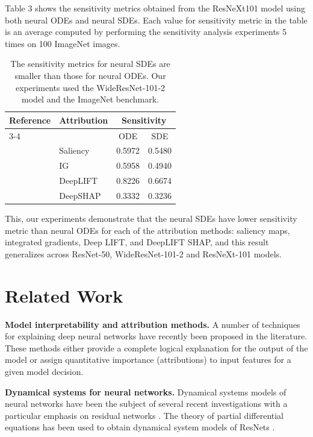 \documentclass[10pt,twocolumn]{article}
\begin{document}
Table 3 shows the sensitivity metrics obtained from the ResNeXt101 model using both neural ODEs and neural SDEs. Each value for sensitivity metric in the table is an average computed by performing the sensitivity analysis experiments 5 times on 100 ImageNet images.

\begin{table}[h!]
\centering
\caption{The sensitivity metrics for neural SDEs are smaller than those for neural ODEs. Our experiments used the WideResNet-101-2 model and the ImageNet benchmark.}
\begin{tabular}{p{4cm}lcc}
\toprule
Reference & Attribution & \multicolumn{2}{c}{Sensitivity} \\
\cmidrule(lr){3-4}
 &  & ODE & SDE \\
\midrule
\cite{simonyan2014deepinsideconvolutionalnetworks} & Saliency & 0.5972 & 0.5480 \\
\cite{pmlr-v70-sundararajan17a} & IG & 0.5958 & 0.4940 \\
\cite{shrikumar2019learningimportantfeaturespropagating} & DeepLIFT & 0.8226 & 0.6674 \\
\cite{lundberg2017unifiedapproachinterpretingmodel} & DeepSHAP & 0.3332 & 0.3236 \\
\bottomrule
\end{tabular}
\label{tab:wideresnet}
\end{table}

This, our experiments demonstrate that the neural SDEs have lower sensitivity metric than neural ODEs for each of the attribution methods: saliency maps, integrated gradients, Deep LIFT, and DeepLIFT SHAP, and this result generalizes across ResNet-50, WideResNet-101-2 and ResNeXt-101 models.

\section{Related Work}

\textbf{Model interpretability and attribution methods.} A number of techniques \cite{adebayo2018sanity} for explaining deep neural networks have recently been proposed in the literature. These methods either provide a complete logical explanation for the output of the model or assign quantitative importance (attributions) to input features for a given model decision.

\textbf{Dynamical systems for neural networks.} Dynamical systems models of neural networks have been the subject of several recent investigations with a particular emphasis on residual networks \cite{adebayo2018sanity}. The theory of partial differential equations has been used to obtain dynamical system models of ResNets \cite{adebayo2018sanity}.
\end{document}
